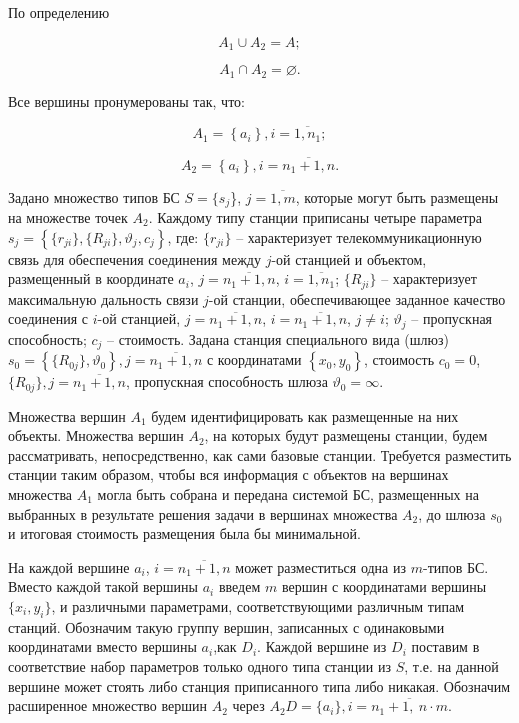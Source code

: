 По определению

$$
A_1 \cup A_2 = A;
$$

$$
A_1 \cap A_2 = \varnothing.
$$

Все вершины пронумерованы так, что:

$$
A_1 = \left\{a_i \right\}, i= \overline{1,n_1};
$$

$$
A_2 = \left\{ a_i  \right\}, i= \overline{n_1+1,n}.
$$


Задано множество типов БС $S = \{s_j$\}, $j=\overline{1,m}$, которые могут быть размещены на множестве точек $A_2$. Каждому типу станции приписаны четыре параметра $s_j = \left\{\{r_{ji}\}, \{R_{ji}\}, \vartheta_j, c_j \right\}$, где:  $\{r_{ji}\}$ -- характеризует телекоммуникационную связь для обеспечения соединения между $j$-ой станцией и объектом, размещенный в координате $a_i$, $j= \overline{n_1+1,n}$, $i= \overline{1,n_1}$; $\{R_{ji}\}$ --  характеризует максимальную дальность связи $j$-ой станции, обеспечивающее заданное качество соединения с $i$-ой станцией, $j= \overline{n_1+1,n}$, $i= \overline{n_1+1,n}$, $j \neq i$; $\vartheta_j$ -- пропускная способность; $c_j$ -- стоимость. Задана станция специального вида (шлюз) $s_0 = \left\{ \{R_{0j}\}, \vartheta_0 \right\}, j = \overline{n_1+1,n}$ с координатами $\left\{x_0, y_0 \right\}$, стоимость $c_0 = 0$, $\{R_{0j}\}, j = \overline{n_1+1,n}$, пропускная способность шлюза $\vartheta_0 = \infty$.


Множества вершин $A_1$ будем идентифицировать как размещенные на них объекты. Множества вершин $A_2$, на которых будут размещены станции, будем рассматривать, непосредственно, как сами базовые станции.  Требуется разместить станции таким образом, чтобы вся информация с объектов на вершинах множества $A_1$ могла быть собрана и передана системой БС, размещенных на выбранных в результате решения задачи в вершинах множества  $A_2$, до шлюза $s_0$ и итоговая стоимость размещения была бы минимальной.


На каждой вершине $a_i$, $i= \overline{n_1+1,n}$ может разместиться одна из $m$-типов БС. Вместо каждой такой вершины $a_i$ введем $m$ вершин с координатами вершины $\{x_i, y_i \}$, и различными параметрами, соответствующими различным типам станций. Обозначим такую группу вершин, записанных с одинаковыми координатами вместо вершины $a_i$,как $D_i$. Каждой вершине из $D_i$ поставим в соответствие набор параметров только одного типа станции из $S$, т.е. на данной вершине может стоять либо станция приписанного типа либо никакая. Обозначим расширенное множество вершин $A_2$ через $A_2D = \{a_i\}, i = \overline{n_1 + 1,\ n \cdot m}$.


